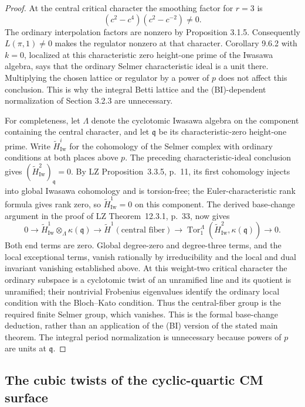 \begin{proof}
At the central critical character the smoothing factor for $r=3$ is
\[
 (c^2-c^4)(c^2-c^{-2})\ne0.
\]
The ordinary interpolation factors are nonzero by Proposition 3.1.5.
Consequently $L(\pi,1)\ne0$ makes the regulator nonzero at that
character.  Corollary 9.6.2 with $k=0$, localized at this characteristic
zero height-one prime of the Iwasawa algebra, says that the ordinary
Selmer characteristic ideal is a unit there.  Multiplying the chosen
lattice or regulator by a power of $p$ does not affect this conclusion.
This is why the integral Betti lattice and the (BI)-dependent
normalization of Section 3.2.3 are unnecessary.

For completeness, let $\Lambda$ denote the cyclotomic Iwasawa algebra
on the component containing the central character, and let $\mathfrak q$
be its characteristic-zero height-one prime. Write
$\widetilde H^i_{\mathrm{Iw}}$ for the cohomology of the Selmer complex
with ordinary conditions at both places above $p$. The preceding
characteristic-ideal conclusion gives
$(\widetilde H^2_{\mathrm{Iw}})_{\mathfrak q}=0$.
By LZ Proposition~3.3.5, p.~11, its first cohomology injects into global
Iwasawa cohomology and is torsion-free; the Euler-characteristic rank
formula gives rank zero, so $\widetilde H^1_{\mathrm{Iw}}=0$ on this
component. The derived base-change argument in the proof of LZ
Theorem~12.3.1, p.~33, now gives
\[
0\longrightarrow
\widetilde H^1_{\mathrm{Iw}}\otimes_\Lambda\kappa(\mathfrak q)
\longrightarrow \widetilde H^1(\text{central fiber})
\longrightarrow
\operatorname{Tor}_1^\Lambda
 (\widetilde H^2_{\mathrm{Iw}},\kappa(\mathfrak q))
\longrightarrow0.
\]
Both end terms are zero. Global degree-zero and degree-three terms,
and the local exceptional terms, vanish rationally by irreducibility
and the local and dual invariant vanishing established above.
At this weight-two critical character the ordinary subspace is a
cyclotomic twist of an unramified line and its quotient is unramified; their nontrivial
Frobenius eigenvalues identify the ordinary local condition with the
Bloch--Kato condition. Thus the central-fiber group is the required
finite Selmer group, which vanishes. This is the formal base-change
deduction, rather than an application of the (BI) version of the stated
main theorem. The integral period normalization is unnecessary because
powers of $p$ are units at $\mathfrak q$.
\end{proof}

\subsection{The cubic twists of the cyclic-quartic CM surface}

